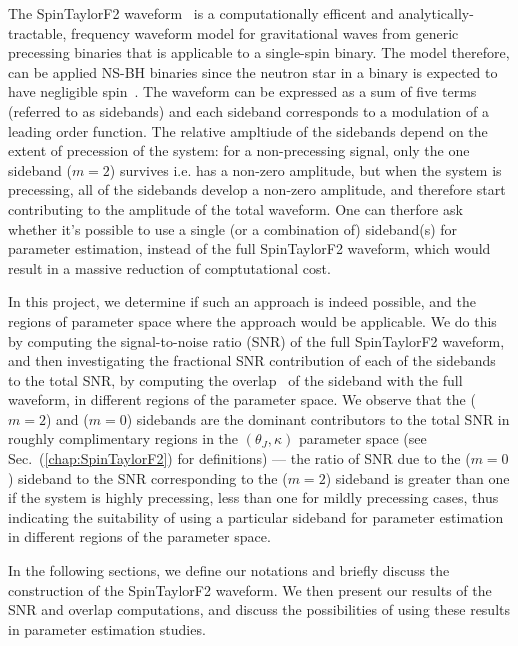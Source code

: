 The SpinTaylorF2 waveform~\cite{Lundgren2014} is a computationally efficent and
analytically-tractable, frequency waveform model for gravitational waves from
generic precessing binaries that is applicable to a single-spin binary. The
model therefore, can be applied NS-BH binaries since the neutron star in a
binary is expected to have negligible spin~\cite{NSBH_upperlims, Brown2012,
Kramer}. The waveform can be expressed as a sum of five terms (referred to as
sidebands) and each sideband corresponds to a modulation of a leading order
function. The relative ampltiude of the sidebands depend on the extent of
precession of the system: for a non-precessing signal,  only the one sideband
($m=2$) survives i.e. has a non-zero amplitude, but when the system is
precessing, all of the sidebands develop a non-zero amplitude, and therefore
start contributing to the amplitude of the total waveform. One can therfore ask
whether it's possible to use a single (or a combination of) sideband(s) for
parameter estimation, instead of the full SpinTaylorF2 waveform, which would
result in  a massive reduction of comptutational cost.

In this project, we determine if such an approach is indeed possible, and the
regions of  parameter space where the approach would be applicable. We do this
by computing the signal-to-noise ratio (SNR) of the full SpinTaylorF2 waveform,
and then investigating the fractional SNR contribution of each of the sidebands
to the total SNR, by computing the overlap~\cite{Creighton} of  the sideband
with the full waveform, in different regions of the parameter space. We observe
that the ($m=2$) and ($m=0$) sidebands are the dominant contributors to the
total SNR in roughly complimentary regions in the $(\theta_J, \kappa)$ parameter
space (see Sec.~(\ref{chap:SpinTaylorF2}) for definitions) --- the
ratio of  SNR due to the ($m=0$) sideband to the SNR corresponding to the
($m=2$) sideband is  greater than one if the system is highly precessing, less
than one for  mildly precessing cases, thus indicating the suitability of using
a particular sideband for parameter estimation in different regions of the
parameter space.

In the following sections, we define our notations and briefly discuss the
construction  of the SpinTaylorF2 waveform. We then present our results of the
SNR and overlap computations, and discuss the possibilities of using these
results in parameter estimation studies.

